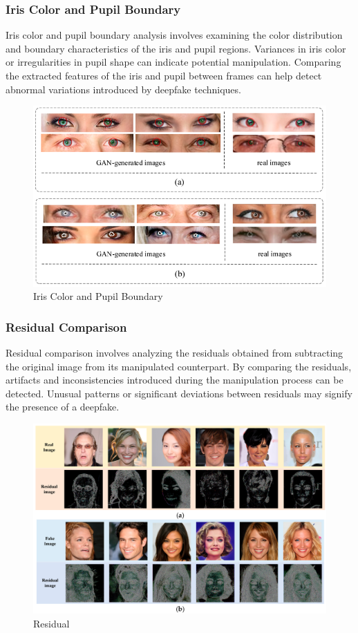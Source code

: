 \subsubsection{Iris Color and Pupil Boundary}

Iris color and pupil boundary analysis involves examining the color distribution and boundary characteristics of the iris and pupil regions. Variances in iris color or irregularities in pupil shape can indicate potential manipulation. Comparing the extracted features of the iris and pupil between frames can help detect abnormal variations introduced by deepfake techniques.
\begin{figure}[htbp]
    \centering
    \includegraphics[width=5in]{img/pupil.png}
    \caption{Iris Color and Pupil Boundary}
\end{figure}


\subsubsection{Residual Comparison}

Residual comparison involves analyzing the residuals obtained from subtracting the original image from its manipulated counterpart. By comparing the residuals, artifacts and inconsistencies introduced during the manipulation process can be detected. Unusual patterns or significant deviations between residuals may signify the presence of a deepfake.
\begin{figure}[htbp]
    \centering
    \includegraphics[width=5in]{img/residual.png}
    \caption{Residual}
\end{figure}


